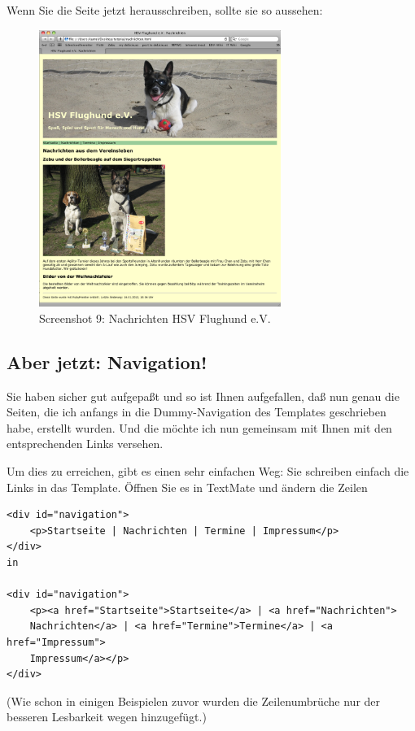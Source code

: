 \documentclass[11pt]{report}
\begin{document}
Wenn Sie die Seite jetzt herausschreiben, sollte sie so aussehen:

\begin{figure}[h!]
\centering
\includegraphics[width=0.7\textwidth]{./images/flughund09.png}
\caption{\label{flughund09}Screenshot 9: Nachrichten HSV Flughund e.V.}
\end{figure}
\subsection{Aber jetzt: Navigation!}
\label{sec-2-1-2-4}


Sie haben sicher gut aufgepaßt und so ist Ihnen aufgefallen, daß nun
genau die Seiten, die ich anfangs in die Dummy-Navigation des
Templates geschrieben habe, erstellt wurden. Und die möchte ich nun
gemeinsam mit Ihnen mit den entsprechenden Links versehen.


Um dies zu erreichen, gibt es einen sehr einfachen Weg: Sie schreiben
einfach die Links in das Template. Öffnen Sie es in TextMate und
ändern die Zeilen


\begin{verbatim}
<div id="navigation">
    <p>Startseite | Nachrichten | Termine | Impressum</p>
</div>
in

<div id="navigation">
    <p><a href="Startseite">Startseite</a> | <a href="Nachrichten">
    Nachrichten</a> | <a href="Termine">Termine</a> | <a href="Impressum">
    Impressum</a></p>
</div>
\end{verbatim}

(Wie schon in einigen Beispielen zuvor wurden die Zeilenumbrüche nur
der besseren Lesbarkeit wegen hinzugefügt.)
\end{document}
